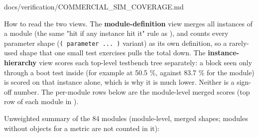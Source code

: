 \begin{relocated}{docs/verification/COMMERCIAL_SIM_COVERAGE.md}
\begin{landscape}
\end{landscape}

How to read the two views. The \textbf{module-definition} view merges
all instances of a module (the same "hit if any instance hit it" rule as
), and counts every parameter shape
(\texttt{(\ parameter\ .\allowbreak{}.\allowbreak{}.\allowbreak{}\ )}
variant) as its own definition, so a rarely-used shape that one small
test exercises pulls the total down. The \textbf{instance-hierarchy}
view scores each top-level testbench tree separately: a block seen only
through a boot test inside  (for example
 at 50.5 \%, against 83.7 \% for the
module) is scored on that instance alone, which is why it is much lower.
Neither is a sign-off number. The per-module rows below are the
module-level merged scores (top row of each module in
).

Unweighted summary of the 84  modules (module-level, merged
shapes; modules without objects for a metric are not counted in it):


\end{relocated}
